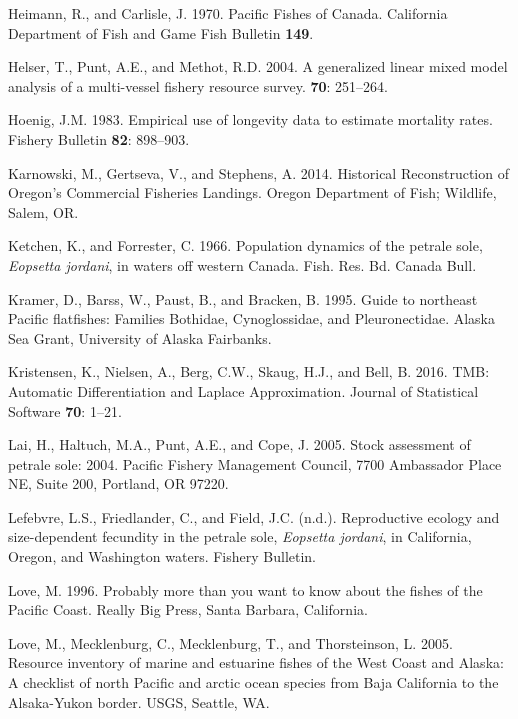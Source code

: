 \documentclass[12pt,]{article}
\begin{document}
\hypertarget{ref-heimann_pacific_1970}{}
Heimann, R., and Carlisle, J. 1970. Pacific Fishes of Canada. California
Department of Fish and Game Fish Bulletin \textbf{149}.

\hypertarget{ref-helser_generalized_2004}{}
Helser, T., Punt, A.E., and Methot, R.D. 2004. A generalized linear
mixed model analysis of a multi-vessel fishery resource survey.
\textbf{70}: 251--264.

\hypertarget{ref-hoenig_empirical_1983}{}
Hoenig, J.M. 1983. Empirical use of longevity data to estimate mortality
rates. Fishery Bulletin \textbf{82}: 898--903.

\hypertarget{ref-karnowski_historical_2014}{}
Karnowski, M., Gertseva, V., and Stephens, A. 2014. Historical
Reconstruction of Oregon's Commercial Fisheries Landings. Oregon
Department of Fish; Wildlife, Salem, OR.

\hypertarget{ref-ketchen_population_1966}{}
Ketchen, K., and Forrester, C. 1966. Population dynamics of the petrale
sole, \emph{Eopsetta jordani}, in waters off western Canada. Fish. Res.
Bd. Canada Bull.

\hypertarget{ref-kramer_guide_1995}{}
Kramer, D., Barss, W., Paust, B., and Bracken, B. 1995. Guide to
northeast Pacific flatfishes: Families Bothidae, Cynoglossidae, and
Pleuronectidae. Alaska Sea Grant, University of Alaska Fairbanks.

\hypertarget{ref-kristensen_tmb:_2016}{}
Kristensen, K., Nielsen, A., Berg, C.W., Skaug, H.J., and Bell, B. 2016.
TMB: Automatic Differentiation and Laplace Approximation. Journal of
Statistical Software \textbf{70}: 1--21.

\hypertarget{ref-lai_stock_2005}{}
Lai, H., Haltuch, M.A., Punt, A.E., and Cope, J. 2005. Stock assessment
of petrale sole: 2004. Pacific Fishery Management Council, 7700
Ambassador Place NE, Suite 200, Portland, OR 97220.

\hypertarget{ref-lefebvre_reproductive_nodate}{}
Lefebvre, L.S., Friedlander, C., and Field, J.C. (n.d.). Reproductive
ecology and size-dependent fecundity in the petrale sole, \emph{Eopsetta
jordani}, in California, Oregon, and Washington waters. Fishery
Bulletin.

\hypertarget{ref-love_milton_probably_1996}{}
Love, M. 1996. Probably more than you want to know about the fishes of
the Pacific Coast. Really Big Press, Santa Barbara, California.

\hypertarget{ref-love_milton_resource_2005}{}
Love, M., Mecklenburg, C., Mecklenburg, T., and Thorsteinson, L. 2005.
Resource inventory of marine and estuarine fishes of the West Coast and
Alaska: A checklist of north Pacific and arctic ocean species from Baja
California to the Alsaka-Yukon border. USGS, Seattle, WA.
\end{document}
